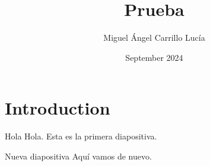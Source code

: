 \documentclass{beamer}
\title{Prueba}
\author{Miguel Ángel Carrillo Lucía}
\date{September 2024}
\begin{document}
\maketitle

\section{Introduction}

\begin{frame}{Hola}
    Hola. Esta es la primera diapositiva.
\end{frame}


\begin{frame}{Nueva diapositiva}
    Aquí vamos de nuevo.
\end{frame}
\end{document}
